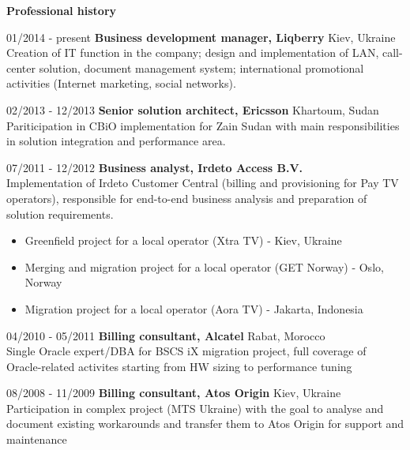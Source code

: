 \documentclass[10pt,a4paper]{extbook}
\begin{document}
\vspace{2mm}
{\large \textbf {Professional history}\par}

\vspace{2mm}
01/2014 -  present \hspace{10mm}\textbf{Business development manager, Liqberry} \hfill Kiev, Ukraine \\
Creation of IT function in the company; design and implementation of LAN, call-center solution, document management system; international promotional activities (Internet marketing, social networks).

\par\vspace{5mm}
02/2013 - 12/2013 \hspace{10mm}\textbf{Senior solution architect, Ericsson} \hfill Khartoum, Sudan \\
Pariticipation in CBiO implementation for Zain Sudan with main responsibilities in solution integration and performance area.

\par\vspace{5mm}
07/2011 - 12/2012 \hspace{10mm} \textbf {Business analyst, Irdeto Access B.V.} \\
Implementation of Irdeto Customer Central (billing and provisioning for Pay TV operators), responsible for end-to-end business analysis and preparation of solution requirements.
\begin{itemize}[noitemsep,topsep=3mm,parsep=0pt,partopsep=0pt,itemindent=0pt,leftmargin=4mm]
	\item Greenfield project for a local operator (Xtra TV) - Kiev, Ukraine
	\item Merging and migration project for a local operator (GET Norway) - Oslo, Norway
	\item Migration project for a local operator (Aora TV) - Jakarta, Indonesia
\end{itemize}

04/2010 - 05/2011 \hspace{10mm} \textbf{Billing consultant, Alcatel} \hfill Rabat, Morocco \\
Single Oracle expert/DBA for BSCS iX migration project, full coverage of Oracle-related activites starting from HW sizing to performance tuning

\par\vspace{5mm}
08/2008 - 11/2009 \hspace{10mm} \textbf{Billing consultant, Atos Origin} \hfill  Kiev, Ukraine \\
Participation in complex project (MTS Ukraine) with the goal to analyse and document existing workarounds and transfer them to Atos Origin for support and maintenance
\end{document}
